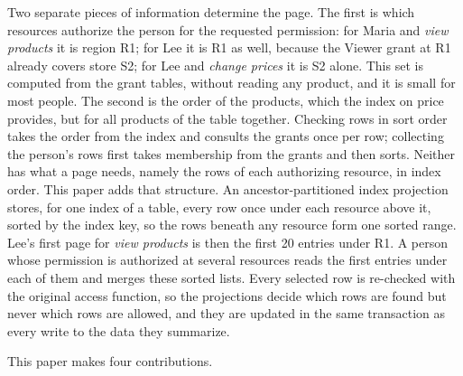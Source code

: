 \documentclass[conference]{IEEEtran}
\begin{document}
Two separate pieces of information determine the page. The first is which resources authorize the person for the requested permission: for Maria and \emph{view products} it is region R1; for Lee it is R1 as well, because the Viewer grant at R1 already covers store S2; for Lee and \emph{change prices} it is S2 alone. This set is computed from the grant tables, without reading any product, and it is small for most people. The second is the order of the products, which the index on price provides, but for all products of the table together. Checking rows in sort order takes the order from the index and consults the grants once per row; collecting the person's rows first takes membership from the grants and then sorts. Neither has what a page needs, namely the rows of each authorizing resource, in index order. This paper adds that structure. An ancestor-partitioned index projection stores, for one index of a table, every row once under each resource above it, sorted by the index key, so the rows beneath any resource form one sorted range. Lee's first page for \emph{view products} is then the first 20 entries under R1. A person whose permission is authorized at several resources reads the first entries under each of them and merges these sorted lists. Every selected row is re-checked with the original access function, so the projections decide which rows are found but never which rows are allowed, and they are updated in the same transaction as every write to the data they summarize.

This paper makes four contributions.
\end{document}
